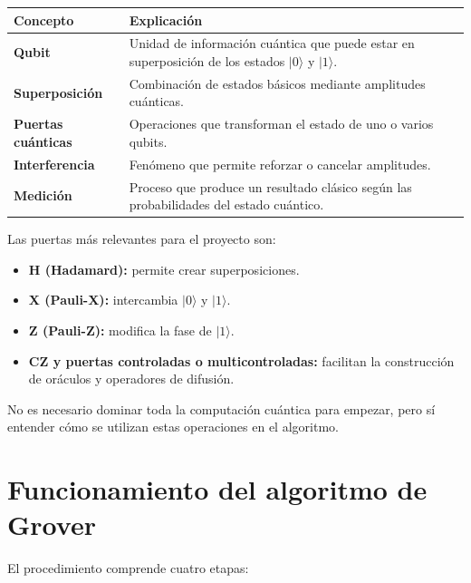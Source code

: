 \documentclass[11pt,a4paper]{article}
\begin{document}
\begin{center}
\begin{tabularx}{\textwidth}{@{}>{\bfseries}p{3.0cm}X@{}}
\toprule
Concepto & Explicación \\
\midrule
Qubit & Unidad de información cuántica que puede estar en superposición de los estados $\lvert 0\rangle$ y $\lvert 1\rangle$. \\
Superposición & Combinación de estados básicos mediante amplitudes cuánticas. \\
Puertas cuánticas & Operaciones que transforman el estado de uno o varios qubits. \\
Interferencia & Fenómeno que permite reforzar o cancelar amplitudes. \\
Medición & Proceso que produce un resultado clásico según las probabilidades del estado cuántico. \\
\bottomrule
\end{tabularx}
\end{center}

Las puertas más relevantes para el proyecto son:

\begin{itemize}
    \item \textbf{H (Hadamard):} permite crear superposiciones.
    \item \textbf{X (Pauli-X):} intercambia $\lvert 0\rangle$ y $\lvert 1\rangle$.
    \item \textbf{Z (Pauli-Z):} modifica la fase de $\lvert 1\rangle$.
    \item \textbf{CZ y puertas controladas o multicontroladas:} facilitan la construcción de oráculos y operadores de difusión.
\end{itemize}

No es necesario dominar toda la computación cuántica para empezar, pero sí entender cómo se utilizan estas operaciones en el algoritmo.

\section{Funcionamiento del algoritmo de Grover}

El procedimiento comprende cuatro etapas:
\end{document}
